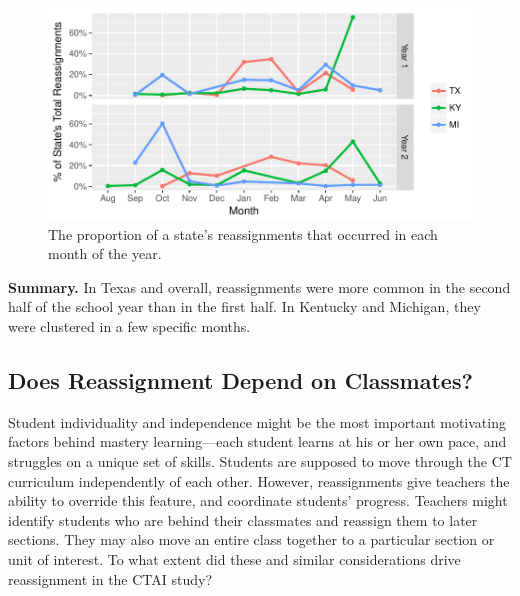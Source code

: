 \documentclass[notitlepage,12pt]{jedm}\usepackage[]{graphicx}\usepackage[]{color}
\makeatletter
\def\maxwidth{ %
  \ifdim\Gin@nat@width>\linewidth
    \linewidth
  \else
    \Gin@nat@width
  \fi
}
\makeatother
\begin{document}
\begin{figure}
  \centering

\includegraphics[width=\maxwidth]{figure/byMonthState-1} 

\caption{The proportion of a state's reassignments that occurred in
  each month of the year.}
\label{fig:byMonthState}
\end{figure}

\textbf{Summary.} In Texas and overall, reassignments were more common
in the second half of the school year than in the first half. In
Kentucky and Michigan, they were clustered in a few specific months.

\subsection{Does Reassignment Depend on Classmates?}

Student individuality and independence might be the most important
motivating factors behind mastery learning---each student learns at
his or her own pace, and struggles on a unique set of skills.
Students are supposed to move through the CT curriculum independently
of each other.
However, reassignments give teachers the ability to override this
feature, and coordinate students' progress.
Teachers might identify students who are behind their classmates and
reassign them to later sections.
They may also move an entire class together to a particular section or
unit of interest.
To what extent did these and similar considerations drive reassignment
in the CTAI study?
\end{document}
